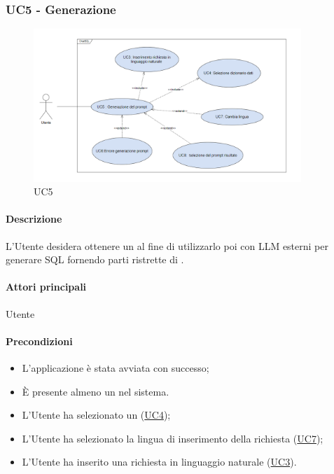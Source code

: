 \subsubsection{UC5 - Generazione }\label{UC5}

\begin{figure}[H]
  \centering
  \includegraphics[width=0.90\textwidth]{assets/uc5.png}
  \caption{UC5}
\end{figure}

\paragraph*{Descrizione}
L’Utente desidera ottenere un  al fine di utilizzarlo poi con LLM esterni per generare  SQL fornendo parti ristrette di .

\paragraph*{Attori principali}
Utente

\paragraph*{Precondizioni}
\begin{itemize}
  \item L'applicazione è stata avviata con successo;
  \item È presente almeno un  nel sistema.
  \item L'Utente ha selezionato un  (\hyperref[UC4]{UC4});
  \item L'Utente ha selezionato la lingua di inserimento della richiesta (\hyperref[UC7]{UC7});
  \item L'Utente ha inserito una richiesta in linguaggio naturale (\hyperref[UC3]{UC3}).
\end{itemize}

